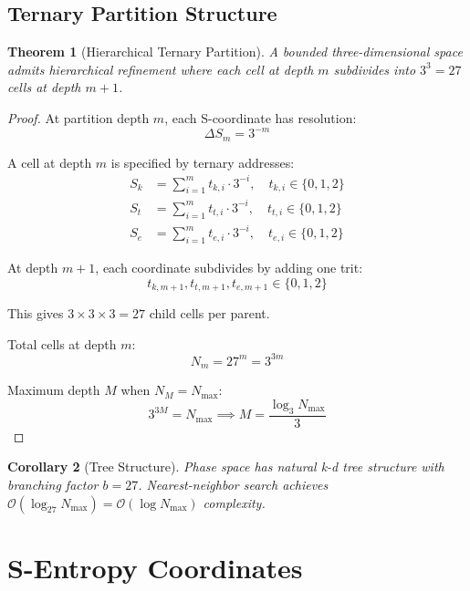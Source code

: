 \documentclass[twocolumn,10pt]{article}
\newtheorem{theorem}{Theorem}[section]
\newtheorem{corollary}[theorem]{Corollary}
\theoremstyle{definition}
\theoremstyle{remark}
\newcommand{\Sk}{S_k}
\newcommand{\St}{S_t}
\newcommand{\Se}{S_e}
\newcommand{\Nmax}{N_{\max}}
\newcommand{\bigO}{\mathcal{O}}
\begin{document}
\subsection{Ternary Partition Structure}

\begin{theorem}[Hierarchical Ternary Partition]
\label{thm:ternary_structure}
A bounded three-dimensional space admits hierarchical refinement where each cell at depth $m$ subdivides into $3^3 = 27$ cells at depth $m+1$.
\end{theorem}

\begin{proof}
At partition depth $m$, each S-coordinate has resolution:
\begin{equation}
\Delta S_m = 3^{-m}
\end{equation}

A cell at depth $m$ is specified by ternary addresses:
\begin{align}
\Sk &= \sum_{i=1}^{m} t_{k,i} \cdot 3^{-i}, \quad t_{k,i} \in \{0,1,2\} \\
\St &= \sum_{i=1}^{m} t_{t,i} \cdot 3^{-i}, \quad t_{t,i} \in \{0,1,2\} \\
\Se &= \sum_{i=1}^{m} t_{e,i} \cdot 3^{-i}, \quad t_{e,i} \in \{0,1,2\}
\end{align}

At depth $m+1$, each coordinate subdivides by adding one trit:
\begin{equation}
t_{k,m+1}, t_{t,m+1}, t_{e,m+1} \in \{0, 1, 2\}
\end{equation}

This gives $3 \times 3 \times 3 = 27$ child cells per parent.

Total cells at depth $m$:
\begin{equation}
N_m = 27^m = 3^{3m}
\end{equation}

Maximum depth $M$ when $N_M = \Nmax$:
\begin{equation}
3^{3M} = \Nmax \implies M = \frac{\log_3 \Nmax}{3}
\end{equation}
\end{proof}

\begin{corollary}[Tree Structure]
\label{cor:tree}
Phase space has natural k-d tree structure with branching factor $b=27$. Nearest-neighbor search achieves $\bigO(\log_{27} \Nmax) = \bigO(\log \Nmax)$ complexity.
\end{corollary}

\section{S-Entropy Coordinates}
\label{sec:entropy_coords}
\end{document}
